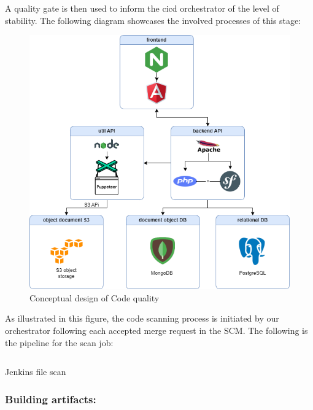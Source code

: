 A quality gate is then used to inform the cicd orchestrator of the level of stability. The following diagram showcases the involved processes of this stage: 

\begin{figure}[H]\centering
\includegraphics[width=1.0\textwidth,angle=00]{assets/f47.png}
\caption{ Conceptual design of Code quality }
\label{fig:conceptual design of Code quality }
\end{figure}



As illustrated in this figure, the code scanning process is initiated by our orchestrator following each accepted merge request in the SCM. The following is the pipeline for the scan job: 

 
\begin{listing}[H]
    \inputminted{Dockerfile}{codeListing/Jenkinsfile_scan}
    \caption{ Jenkins file scan}
    \label{lst:jenkinsfile_scan}
\end{listing}
 

\subsubsection{Building artifacts: }


